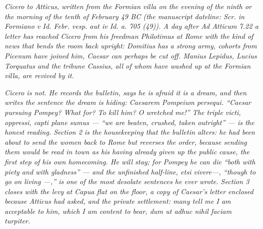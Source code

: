 
\textit{Cicero to Atticus, written from the Formian
villa on the evening of the ninth or the morning of
the tenth of February 49 BC (the manuscript dateline:
\textit{Scr. in Formiano v Id. Febr. vesp. aut iv Id.
a. 705 (49)}). A day after \emph{Ad Atticum} 7.22 a
letter has reached Cicero from his freedman Philotimus
at Rome with the kind of news that bends the room
back upright: Domitius has a strong army, cohorts
from Picenum have joined him, Caesar can perhaps be
cut off. Manius Lepidus, Lucius Torquatus and the
tribune Cassius, all of whom have washed up at the
Formian villa, are revived by it.}

\textit{Cicero is not. He records the bulletin, says
he is afraid it is a dream, and then writes the
sentence the dream is hiding: \emph{Caesarem
Pompeium persequi}. ``Caesar pursuing Pompey? What
for? To kill him? O wretched me!'' The triple
\emph{victi, oppressi, capti plane sumus} --- ``we
are beaten, crushed, taken outright'' --- is the
honest reading. Section 2 is the housekeeping that
the bulletin alters: he had been about to send the
women back to Rome but reverses the order, because
sending them would be read in town as his having
already given up the public cause, the first step of
his own homecoming. He will stay; for Pompey he can
die ``both with piety and with gladness'' --- and the
unfinished half-line, \emph{etsi vivere---}, ``though
to go on living ---,'' is one of the most desolate
sentences he ever wrote. Section 3 closes with the
levy at Capua flat on the floor, a copy of Caesar's
letter enclosed because Atticus had asked, and the
private settlement: many tell me I am acceptable to
him, which I am content to bear, \emph{dum ut adhuc
nihil faciam turpiter}.}
